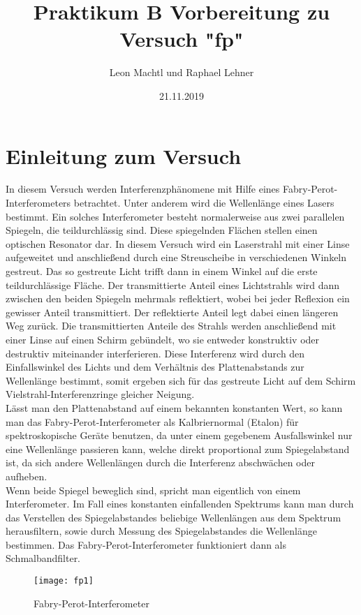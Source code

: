 \documentclass[a4paper,10pt]{scrartcl}
\title{Praktikum B Vorbereitung zu Versuch "fp"}
\author{Leon Machtl und Raphael Lehner}
\date{21.11.2019}
\begin{document}
	\maketitle
	\tableofcontents
	\newpage
	
	\section{Einleitung zum Versuch}
	In diesem Versuch werden Interferenzphänomene mit Hilfe eines Fabry-Perot-Interferometers betrachtet. Unter anderem wird die Wellenlänge eines Lasers bestimmt. Ein solches Interferometer besteht normalerweise aus zwei parallelen Spiegeln, die teildurchlässig sind. Diese spiegelnden Flächen stellen einen optischen Resonator dar. In diesem Versuch wird ein Laserstrahl mit einer Linse aufgeweitet und anschließend durch eine Streuscheibe in verschiedenen Winkeln gestreut. Das so gestreute Licht trifft dann in einem Winkel auf die erste teildurchlässige Fläche. Der transmittierte Anteil eines Lichtstrahls wird dann zwischen den beiden Spiegeln mehrmals reflektiert, wobei bei jeder Reflexion ein gewisser Anteil transmittiert. Der reflektierte Anteil legt dabei einen längeren Weg zurück. Die transmittierten Anteile des Strahls werden anschließend mit einer Linse auf einen Schirm gebündelt, wo sie entweder konstruktiv oder destruktiv miteinander interferieren. Diese Interferenz wird durch den Einfallswinkel des Lichts und dem Verhältnis des Plattenabstands zur Wellenlänge bestimmt, somit ergeben sich für das gestreute Licht auf dem Schirm Vielstrahl-Interferenzringe gleicher Neigung. \\
	Lässt man den Plattenabstand auf einem bekannten konstanten Wert, so kann man das Fabry-Perot-Interferometer als Kalbriernormal (Etalon) für spektroskopische Geräte benutzen, da unter einem gegebenem Ausfallswinkel nur eine Wellenlänge passieren kann, welche direkt proportional zum Spiegelabstand ist, da sich andere Wellenlängen durch die Interferenz abschwächen oder aufheben.\\
	Wenn beide Spiegel beweglich sind, spricht man eigentlich von einem Interferometer. Im Fall eines konstanten einfallenden Spektrums kann man durch das Verstellen des Spiegelabstandes beliebige Wellenlängen aus dem Spektrum herausfiltern, sowie durch Messung des Spiegelabstandes die Wellenlänge bestimmen. Das Fabry-Perot-Interferometer funktioniert dann als Schmalbandfilter.
	\begin{figure}[h]
\centering
\texttt{[image: fp1]}
\caption{Fabry-Perot-Interferometer}
\end{figure}
\FloatBarrier
	
\end{document}
